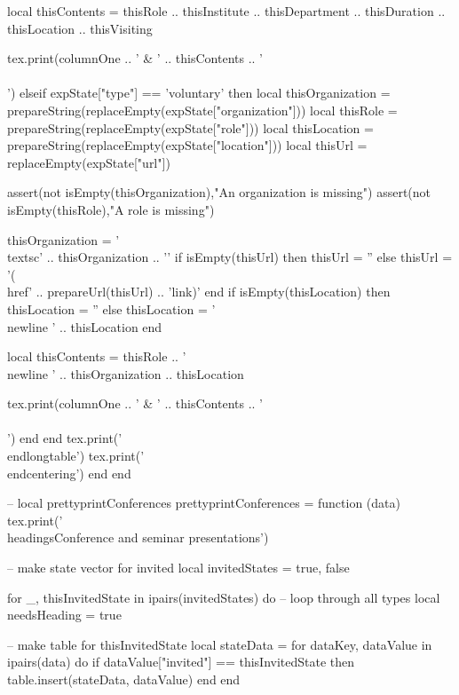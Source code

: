 \documentclass[letterpaper, 10pt]{article}
\newcommand{\headings}[1]{\section*{#1} \hrule \vspace{10pt}}
\begin{document}
\begin{luacode}
					local thisContents = thisRole ..
										thisInstitute .. thisDepartment .. thisDuration ..
										thisLocation ..
										thisVisiting

					tex.print(columnOne .. ' & ' .. thisContents .. ' \\\\')
				elseif expState["type"] == 'voluntary' then
					local thisOrganization 	= prepareString(replaceEmpty(expState["organization"]))
					local thisRole  		= prepareString(replaceEmpty(expState["role"]))
					local thisLocation      = prepareString(replaceEmpty(expState["location"]))
					local thisUrl 			= replaceEmpty(expState["url"])

					assert(not isEmpty(thisOrganization),"An organization is missing")
					assert(not isEmpty(thisRole),"A role is missing")

					thisOrganization = '\\textsc{' .. thisOrganization .. '}'
					if isEmpty(thisUrl) then
						thisUrl = ''
					else
						thisUrl = '(\\href{' .. prepareUrl(thisUrl) .. '}{link})'
					end
					if isEmpty(thisLocation) then
						thisLocation = ''
					else
						thisLocation = '\\newline ' .. thisLocation
					end

					local thisContents = thisRole ..
										'\\newline ' .. thisOrganization ..
										thisLocation

					tex.print(columnOne .. ' & ' .. thisContents .. '\\\\')
				end
			end
			tex.print('\\end{longtable}')
			tex.print('\\end{centering}')
		end
	end

	-- local prettyprintConferences
	prettyprintConferences = function (data)
		tex.print('\\headings{Conference and seminar presentations}')

		-- make state vector for invited
		local invitedStates = {true, false}

		for _, thisInvitedState in ipairs(invitedStates) do 											-- loop through all types
			local needsHeading = true

			-- make table for thisInvitedState
			local stateData = {}
			for dataKey, dataValue in ipairs(data) do
				if dataValue["invited"] == thisInvitedState then
					table.insert(stateData, dataValue)
				end
			end


\end{luacode}
\end{document}
